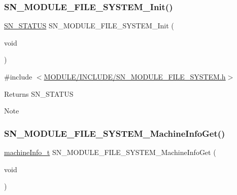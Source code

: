 \subsubsection{\texorpdfstring{S\+N\+\_\+\+M\+O\+D\+U\+L\+E\+\_\+\+F\+I\+L\+E\+\_\+\+S\+Y\+S\+T\+E\+M\+\_\+\+Init()}{SN\_MODULE\_FILE\_SYSTEM\_Init()}}
{\footnotesize\ttfamily \hyperlink{group__SYSTEM__ERROR_ga4540713b9a7a18ce44d78c3a10f7442f}{S\+N\+\_\+\+S\+T\+A\+T\+US} S\+N\+\_\+\+M\+O\+D\+U\+L\+E\+\_\+\+F\+I\+L\+E\+\_\+\+S\+Y\+S\+T\+E\+M\+\_\+\+Init (\begin{DoxyParamCaption}\item[{void}]{ }\end{DoxyParamCaption})}



{\ttfamily \#include $<$\hyperlink{SN__MODULE__FILE__SYSTEM_8h}{M\+O\+D\+U\+L\+E/\+I\+N\+C\+L\+U\+D\+E/\+S\+N\+\_\+\+M\+O\+D\+U\+L\+E\+\_\+\+F\+I\+L\+E\+\_\+\+S\+Y\+S\+T\+E\+M.\+h}$>$}

\begin{DoxyReturn}{Returns}
S\+N\+\_\+\+S\+T\+A\+T\+US 
\end{DoxyReturn}
\begin{DoxyNote}{Note}

\end{DoxyNote}
\mbox{\label{group__MODULE__FILE__SYSTEM_ga647e18cfc2415cb546d69b327ed76232}} 
\subsubsection{\texorpdfstring{S\+N\+\_\+\+M\+O\+D\+U\+L\+E\+\_\+\+F\+I\+L\+E\+\_\+\+S\+Y\+S\+T\+E\+M\+\_\+\+Machine\+Info\+Get()}{SN\_MODULE\_FILE\_SYSTEM\_MachineInfoGet()}}
{\footnotesize\ttfamily \hyperlink{structmachine__information}{machine\+Info\+\_\+t} S\+N\+\_\+\+M\+O\+D\+U\+L\+E\+\_\+\+F\+I\+L\+E\+\_\+\+S\+Y\+S\+T\+E\+M\+\_\+\+Machine\+Info\+Get (\begin{DoxyParamCaption}\item[{void}]{ }\end{DoxyParamCaption})}



